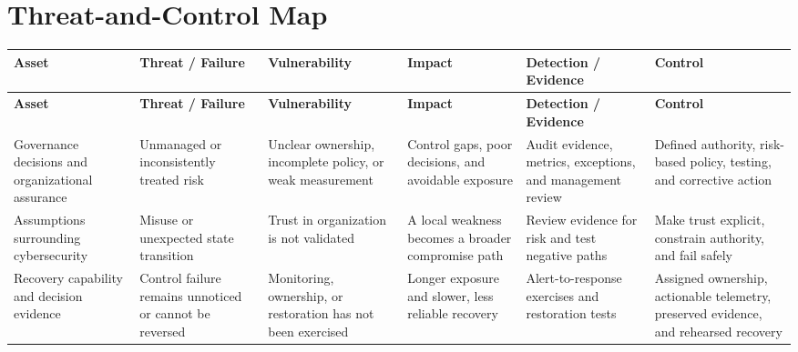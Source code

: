 \documentclass[11pt,letterpaper]{article}
\begin{document}
\section*{Threat-and-Control Map}
\begingroup\scriptsize\setlength{\tabcolsep}{2pt}
\begin{longtable}{>{\raggedright\arraybackslash}p{}>{\raggedright\arraybackslash}p{}>{\raggedright\arraybackslash}p{}>{\raggedright\arraybackslash}p{}>{\raggedright\arraybackslash}p{}>{\raggedright\arraybackslash}p{}}
\toprule\rowcolor{Navy}\color{white}\textbf{Asset} & \color{white}\textbf{Threat / Failure} & \color{white}\textbf{Vulnerability} & \color{white}\textbf{Impact} & \color{white}\textbf{Detection / Evidence} & \color{white}\textbf{Control}\\\midrule
\endfirsthead
\toprule\rowcolor{Navy}\color{white}\textbf{Asset} & \color{white}\textbf{Threat / Failure} & \color{white}\textbf{Vulnerability} & \color{white}\textbf{Impact} & \color{white}\textbf{Detection / Evidence} & \color{white}\textbf{Control}\\\midrule
\endhead
Governance decisions and organizational assurance & Unmanaged or inconsistently treated risk & Unclear ownership, incomplete policy, or weak measurement & Control gaps, poor decisions, and avoidable exposure & Audit evidence, metrics, exceptions, and management review & Defined authority, risk-based policy, testing, and corrective action\\\midrule
Assumptions surrounding cybersecurity & Misuse or unexpected state transition & Trust in organization is not validated & A local weakness becomes a broader compromise path & Review evidence for risk and test negative paths & Make trust explicit, constrain authority, and fail safely\\\midrule
Recovery capability and decision evidence & Control failure remains unnoticed or cannot be reversed & Monitoring, ownership, or restoration has not been exercised & Longer exposure and slower, less reliable recovery & Alert-to-response exercises and restoration tests & Assigned ownership, actionable telemetry, preserved evidence, and rehearsed recovery\\\midrule
\bottomrule
\end{longtable}
\endgroup
\end{document}
